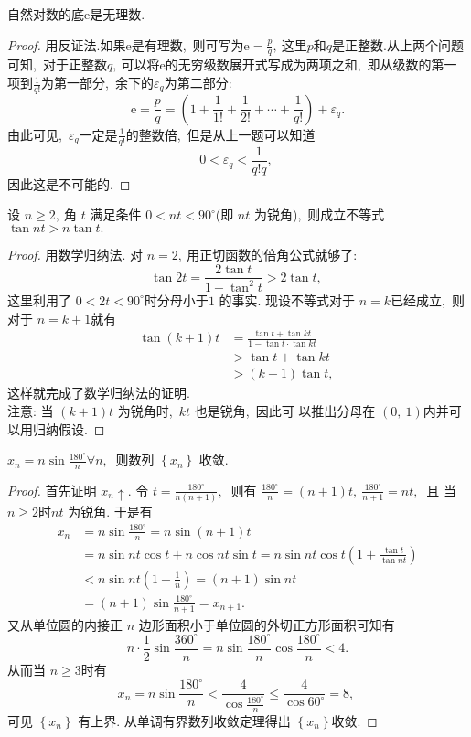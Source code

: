 \begin{problem}
	自然对数的底$\mathrm{e}$是无理数.
\end{problem}
\begin{proof}
	用反证法.如果$\mathrm{e}$是有理数,\ 则可写为$\mathrm{e}=\frac{p}{q},\ $这里$p$和$q$是正整数.从上两个问题可知,\ 对于正整数$q,\ $可以将$\mathrm{e}$的无穷级数展开式写成为两项之和,\ 即从级数的第一项到$\frac{1}{q!}$为第一部分,\ 余下的$\varepsilon_q$为第二部分:
	$$\mathrm{e}=\frac{p}{q}=\left(1+\frac{1}{1!}+\frac{1}{2!}+\cdots+\frac{1}{q!}\right)+\varepsilon_q.$$
	由此可见,\ $\varepsilon_q$一定是$\frac{1}{q!}$的整数倍,\ 但是从上一题可以知道
	$$0<\varepsilon_q<\frac{1}{q!q},\ $$
	因此这是不可能的.
\end{proof}
\newpage
\begin{lemma}
	设  $n \geqslant 2 ,\  $角 $ t $ 满足条件 $ 0<n t<90^{\circ}  $(即 $ n t $ 为锐角),\  则成立不等式  $\tan n t>n \tan t .$
\end{lemma}
\begin{proof}
	用数学归纳法. 对 $ n=2 ,\  $用正切函数的倍角公式就够了:
	$$\tan 2 t=\frac{2 \tan t}{1-\tan ^{2} t}>2 \tan t,\ $$
	这里利用了 $ 0<2 t<90^{\circ}  $时分母小于$ 1$ 的事实.
	现设不等式对于 $ n=k  $已经成立,\  则对于 $ n=k+1  $就有
	$$\begin{aligned}
		\tan (k+1) t & =\frac{\tan t+\tan k t}{1-\tan t \cdot \tan k t} \\
		& >\tan t+\tan k t \\
		& >(k+1) \tan t,\ 
	\end{aligned}$$
	这样就完成了数学归纳法的证明.\\ 
	注意: 当 $ (k+1) t $ 为锐角时,\  $ k t $ 也是锐角,\  因此可 以推出分母在  $(0,\ 1) $内并可以用归纳假设.
\end{proof}
\begin{theorem}
	$x_{n}=n \sin \frac{180^{\circ}}{n} \forall n ,\ $ 则数列  $\left\{x_{n}\right\} $ 收敛.
\end{theorem}
\begin{proof}
	首先证明 $ x_{n} \uparrow .$ 令  $t=\frac{180^{\circ}}{n(n+1)} ,\ $ 则有  $\frac{180^{\circ}}{n}=(n+1) t,\  \frac{180^{\circ}}{n+1}=n t ,\ $ 且 当$  n \geqslant 2  $时$  n t $ 为锐角.
	于是有
	$$\begin{aligned}
		x_{n} & =n \sin \frac{180^{\circ}}{n}=n \sin (n+1) t \\
		& =n \sin n t \cos t+n \cos n t \sin t=n \sin n t \cos t\left(1+\frac{\tan t}{\tan n t}\right) \\
		& <n \sin n t\left(1+\frac{1}{n}\right)=(n+1) \sin n t \\
		& =(n+1) \sin \frac{180^{\circ}}{n+1}=x_{n+1} .
	\end{aligned}$$
	又从单位圆的内接正  $n $ 边形面积小于单位圆的外切正方形面积可知有
	$$n \cdot \frac{1}{2} \sin \frac{360^{\circ}}{n}=n \sin \frac{180^{\circ}}{n} \cos \frac{180^{\circ}}{n}<4 .$$
	从而当 $ n \geqslant 3  $时有
	$$x_{n}=n \sin \frac{180^{\circ}}{n}<\frac{4}{\cos \frac{180^{\circ}}{n}} \leqslant \frac{4}{\cos 60^{\circ}}=8,\ $$
	可见  $\left\{x_{n}\right\} $ 有上界. 从单调有界数列收敛定理得出  $\left\{x_{n}\right\}  $收敛.
\end{proof}
